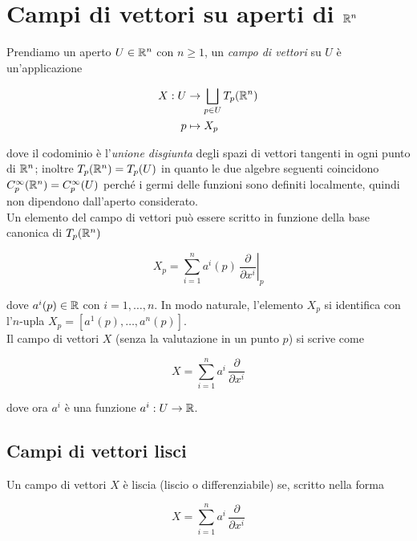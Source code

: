 \section{Campi di vettori su aperti di $ \mathbb{R}^{n} $}

Prendiamo un aperto $ U \in \mathbb{R}^{n} $ con $ n \geqslant 1 $, un \textit{campo di vettori} su $ U $ è un'applicazione

\begin{align}
	\begin{split}
		X : U &\to \bigsqcup_{p \in U} T_{p}(\mathbb{R}^{n})\\
		p &\mapsto X_{p}
	\end{split}
\end{align}

dove il codominio è l'\textit{unione disgiunta} degli spazi di vettori tangenti in ogni punto di $ \mathbb{R}^{n} $; inoltre $ T_{p}(\mathbb{R}^{n}) = T_{p}(U) $ in quanto le due algebre seguenti coincidono $ C_{p}^{\infty}(\mathbb{R}^{n}) = C_{p}^{\infty}(U) $ perché i germi delle funzioni sono definiti localmente, quindi non dipendono dall'aperto considerato.\\
Un elemento del campo di vettori può essere scritto in funzione della base canonica di $ T_{p}(\mathbb{R}^{n}) $

\begin{equation}
	X_{p} = \sum_{i=1}^{n} a^{i}(p) \, \left. \dfrac{\partial}{\partial x^{i}} \right|_{p}
\end{equation}

dove $ a^{i}(p) \in \mathbb{R} $ con $ i=1,\dots,n $. In modo naturale, l'elemento $ X_{p} $ si identifica con l'$ n $-upla $ X_{p} = [a^{1}(p),\dots,a^{n}(p)] $.\\
Il campo di vettori $ X $ (senza la valutazione in un punto $ p $) si scrive come

\begin{equation}
	X = \sum_{i=1}^{n} a^{i} \, \dfrac{\partial}{\partial x^{i}}
\end{equation}

dove ora $ a^{i} $ è una funzione $ a^{i} : U \to \mathbb{R} $.

\subsection{Campi di vettori lisci}

Un campo di vettori $ X $ è liscia (liscio o differenziabile) se, scritto nella forma

\begin{equation}
	X = \sum_{i=1}^{n} a^{i} \, \dfrac{\partial}{\partial x^{i}}
\end{equation}

